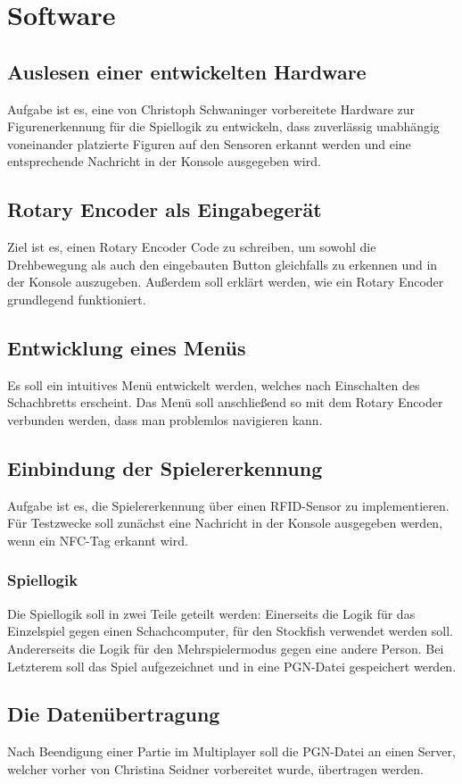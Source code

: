 \section{Software}

\subsection{Auslesen einer entwickelten Hardware}
Aufgabe ist es, eine von Christoph Schwaninger vorbereitete Hardware zur Figurenerkennung für die Spiellogik zu entwickeln, dass 
zuverlässig unabhängig voneinander platzierte Figuren auf den Sensoren erkannt werden und eine entsprechende Nachricht 
in der Konsole ausgegeben wird.

\subsection{Rotary Encoder als Eingabegerät}
Ziel ist es, einen Rotary Encoder Code zu schreiben, um sowohl die Drehbewegung als auch den eingebauten Button 
gleichfalls zu erkennen und in der Konsole auszugeben. Außerdem soll erklärt werden, wie ein Rotary Encoder grundlegend 
funktioniert.

\subsection{Entwicklung eines Menüs}
Es soll ein intuitives Menü entwickelt werden, welches nach Einschalten des Schachbretts erscheint. Das Menü soll 
anschließend so mit dem Rotary Encoder verbunden werden, dass man problemlos navigieren kann.

\subsection{Einbindung der Spielererkennung}
Aufgabe ist es, die Spielererkennung über einen RFID-Sensor zu implementieren. Für Testzwecke soll zunächst
eine Nachricht in der Konsole ausgegeben werden, wenn ein NFC-Tag erkannt wird.

\subsubsection{Spiellogik}
Die Spiellogik soll in zwei Teile geteilt werden: Einerseits die Logik für das Einzelspiel gegen einen Schachcomputer, 
für den Stockfish verwendet werden soll. Andererseits die Logik für den Mehrspielermodus gegen eine andere Person. 
Bei Letzterem soll das Spiel aufgezeichnet und in eine PGN-Datei gespeichert werden.

\subsection{Die Datenübertragung}
Nach Beendigung einer Partie im Multiplayer soll die PGN-Datei an einen Server, welcher vorher von Christina Seidner 
vorbereitet wurde, übertragen werden.